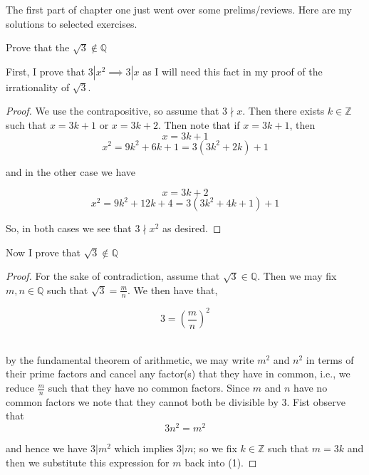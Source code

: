 \documentclass[11pt,largemargins]{homework}
\newcommand{\Q}{\mathbb{Q}}
\newcommand{\Z}{\mathbb{Z}}
\begin{document}
\maketitle
The first part of chapter one just went over some prelims/reviews. Here are my solutions to selected exercises. 
\question
    \begin{alphaparts}
        \questionpart
            Prove that the $\sqrt{3} \notin \Q$
            
            First, I prove that $3|x^2 \implies 3|x$ as I will need this fact in my proof of the irrationality of $\sqrt{3}$. 
            
            \begin{proof}
                We use the contrapositive, so assume that $3\nmid x$. Then there exists $k \in \Z$ such that $x = 3k + 1$ or $ x = 3k + 2$. Then note that if $x = 3k + 1$, then 
                \[ x = 3k + 1 \] 
                \[ x^2 = 9k^2 + 6k + 1 = 3(3k^2 + 2k) + 1\]
                
                and in the other case we have
                
                \[ x = 3k + 2 \] 
                \[ x^2 = 9k^2 + 12k + 4 = 3(3k^2 + 4k + 1) + 1 \] 
                
                So, in both cases we see that $3\nmid x^2$ as desired. 
            \end{proof}
            
            Now I prove that $\sqrt{3} \notin \Q$ 
            \begin{proof}
                For the sake of contradiction, assume that $\sqrt{3} \in \Q$. Then we may fix $m, n \in \Q$ such that $\sqrt{3} = \frac{m}{n}$. We then have that, 
                
                \[ 3 = \left(\frac{m}{n}\right)^2 \]\ 
                
                by the fundamental theorem of arithmetic, we may write $m^2$ and $n^2$ in terms of their prime factors and cancel any factor(s) that they have in common, i.e., we reduce $\frac{m}{n}$ such that they have no common factors. Since $m$ and $n$ have no common factors we note that they cannot both be divisible by 3. Fist observe that 
                \begin{equation}
                    3n^2 = m^2
                \end{equation}
                
                
                and hence we have $3| m^2$ which implies $3|m$; so we fix $k \in \Z$ such that $ m = 3k$ and then we substitute this expression for $m$ back into (1). 
                

\end{proof}
\end{alphaparts}
\end{document}
